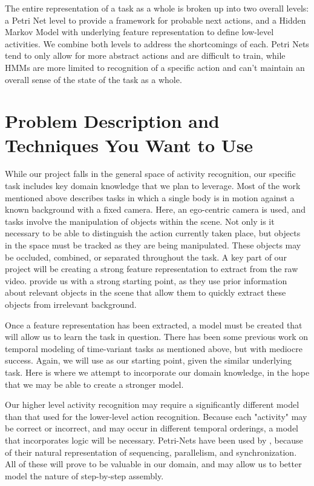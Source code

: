 \documentclass[10pt,letterpaper]{article}
\begin{document}
The entire representation of a task as a whole is broken up into two overall levels: a Petri Net level to provide a framework for probable next actions, and a Hidden Markov Model with underlying feature representation to define low-level activities. We combine both levels to address the shortcomings of each. Petri Nets tend to only allow for more abstract actions and are difficult to train, while HMMs are more limited to recognition of a specific action and can't maintain an overall sense of the state of the task as a whole.
  
\section{Problem Description and Techniques You Want to Use}

While our project falls in the general space of activity recognition, our specific task includes key domain knowledge that we plan to leverage. Most of the work mentioned above describes tasks in which a single body is in motion against a known background with a fixed camera. Here, an ego-centric camera is used, and tasks involve the manipulation of objects within the scene. Not only is it necessary to be able to distinguish the action currently taken place, but objects in the space must be tracked as they are being manipulated. These objects may be occluded, combined, or separated throughout the task. A key part of our project will be creating a strong feature representation to extract from the raw video. \cite{starner1998real} provide us with a strong starting point, as they use prior information about relevant objects in the scene that allow them to quickly extract these objects from irrelevant background. 

Once a feature representation has been extracted, a model must be created that will allow us to learn the task in question. There has been some previous work on temporal modeling of time-variant tasks as mentioned above, but with mediocre success. Again, we will use \cite{starner1998real} as our starting point, given the similar underlying task. Here is where we attempt to incorporate our domain knowledge, in the hope that we may be able to create a stronger model.

Our higher level activity recognition may require a significantly different model than that used for the lower-level action recognition. Because each "activity" may be correct or incorrect, and may occur in different temporal orderings, a model that incorporates logic will be necessary. Petri-Nets have been used by \cite{castel1996going}, because of their natural representation of sequencing, parallelism, and synchronization. All of these will prove to be valuable in our domain, and may allow us to better model the nature of step-by-step assembly.
\end{document}
